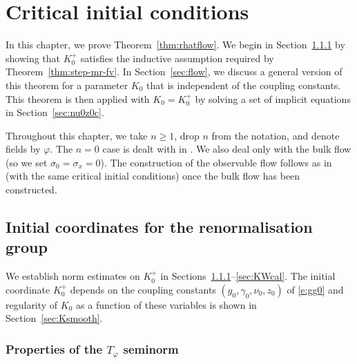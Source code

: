 \chapter{Critical initial conditions}
\label{sec:RGflow}

\setcounter{footnote}{0}

\renewcommand{\pm}{+}

In this chapter, we prove Theorem~\ref{thm:rhatflow}.
We begin in Section~\ref{sec:norms} by
showing that $K^+_0$ satisfies the inductive assumption required by
Theorem~\ref{thm:step-mr-fv}. In Section~\ref{sec:flow}, we discuss a general
version of this theorem for a parameter $K_0$ that is independent of the
coupling constants. This theorem is then applied with $K_0 = K^+_0$ by solving
a set of implicit equations in Section~\ref{sec:nu0z0c}.

Throughout this chapter, we take $n \ge 1$, drop $n$ from the notation, and
denote fields by $\varphi$. The $n = 0$ case is dealt with in \cite{BSW-saw-sa}.
We also deal only with the bulk flow (so we set $\sigma_0 = \sigma_x = 0$).
The construction of the observable flow follows as in \cite{ST-phi4} (with the same
critical initial conditions) once the bulk flow has been constructed.


\section{Initial coordinates for the renormalisation group}
\label{sec:K0bd}

We establish norm estimates on $K^{\pm}_0$ in Sections~\ref{sec:norms}--\ref{sec:KWcal}.
The initial coordinate $K^{\pm}_0$ depends on the coupling constants
$(g_0, \gamma_0, \nu_0, z_0)$ of \eqref{e:gg0} and regularity of $K_0$ as a
function of these variables is shown in Section~\ref{sec:Ksmooth}.


\subsection{Properties of the \texorpdfstring{$T_\varphi$}{Tphi} seminorm}
\label{sec:norms}

